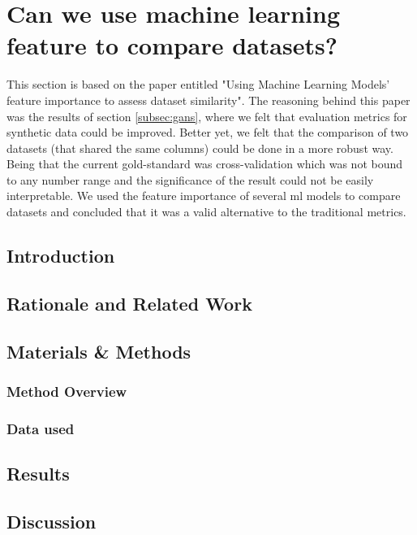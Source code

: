 



\section{Can we use machine learning feature to compare datasets?}\label{subsec:similarity}
This section is based on the paper entitled "Using Machine Learning Models' feature importance to assess dataset similarity". The reasoning behind this paper was the results of section \ref{subsec:gans}, where we felt that evaluation metrics for synthetic data could be improved. Better yet, we felt that the comparison of two datasets (that shared the same columns) could be done in a more robust way. Being that the current gold-standard was cross-validation which was not bound to any number range and the significance of the result could not be easily interpretable. We used the feature importance of several \ac{ml} models to compare datasets and concluded that it was a valid alternative to the traditional metrics.

\subsection{Introduction}

\subsection{Rationale and Related Work}

\subsection{Materials \& Methods}
\subsubsection{Method Overview}

\subsubsection{Data used}

\subsection{Results}

\subsection{Discussion}

